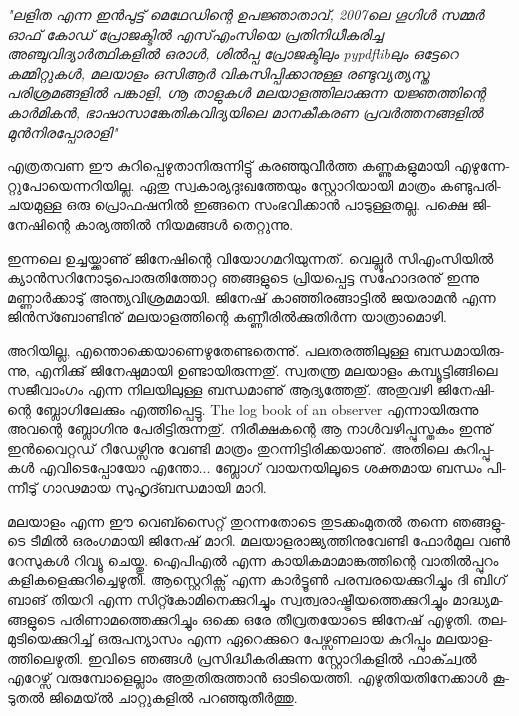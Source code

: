 \vskip 2pt

‌\emph{"ലളിത എന്ന ഇന്‍പുട്ട് മെഥേഡിന്റെ ഉപജ്ഞാതാവ്, 2007ലെ ഗൂഗിള്‍ സമ്മര്‍ ഓഫ് കോഡ് പ്രോജക്ടില്‍ എസ്എംസിയെ 
പ്രതിനിധീകരിച്ച അഞ്ചുവിദ്യാര്‍ത്ഥികളില്‍ ഒരാള്‍, ശില്‍പ്പ പ്രോജക്ടിലും pypdflibലും ഒട്ടേറെ കമ്മിറ്റുകള്‍, മലയാളം ഒസിആര്‍ 
വികസിപ്പിക്കാനുള്ള രണ്ടുവ്യത്യസ്ത പരിശ്രമങ്ങളില്‍ പങ്കാളി, ഗ്നൂ താളുകള്‍ മലയാളത്തിലാക്കുന്ന യജ്ഞത്തിന്റെ കാര്‍മികന്‍, 
ഭാഷാസാങ്കേതികവിദ്യയിലെ മാനകീകരണ പ്രവര്‍ത്തനങ്ങളില്‍ മുന്‍നിരപ്പോരാളി"}

\vskip 2pt

എ­ത്ര­ത­വണ ഈ കു­റി­പ്പെ­ഴു­താ­നി­രു­ന്നി­ട്ടു് കര­ഞ്ഞു­വീര്‍­ത്ത കണ്ണു­ക­ളു­മാ­യി എഴു­ന്നേ­റ്റു­പോ­യെ­ന്ന­റി­യി­ല്ല. ഏതു സ്വ­കാ­ര്യ­ദുഃ­ഖ­ത്തേ­യും 
സ്റ്റോ­റി­യാ­യി മാ­ത്രം കണ്ടു­പ­രി­ച­യ­മു­ള്ള ഒരു പ്രൊ­ഫ­ഷ­നില്‍ ഇങ്ങ­നെ സം­ഭ­വി­ക്കാന്‍ പാ­ടു­ള്ള­ത­ല്ല. പക്ഷെ ജി­നേ­ഷി­ന്റെ 
കാ­ര്യ­ത്തില്‍ നി­യ­മ­ങ്ങള്‍ തെ­റ്റു­ന്നു.

ഇ­ന്ന­ലെ ഉച്ച­യ്ക്കാ­ണു് ജി­നേ­ഷി­ന്റെ വി­യോ­ഗ­മ­റി­യു­ന്ന­ത്. വെ­ല്ലൂര്‍ സി­എം­സി­യില്‍ ക്യാന്‍­സ­റി­നോ­ടു­പൊ­രു­തി­ത്തോ­റ്റ ഞങ്ങ­ളു­ടെ 
പ്രി­യ­പ്പെ­ട്ട സഹോ­ദ­ര­നു് ഇന്നു മണ്ണാര്‍­ക്കാ­ടു് അന്ത്യ­വി­ശ്ര­മ­മാ­യി. ജി­നേ­ഷ് കാ­ഞ്ഞി­ര­ങ്ങാ­ട്ടില്‍ ജയ­രാ­മന്‍ എന്ന ജിന്‍സ്ബോണ്ടിനു്
മല­യാ­ള­ത്തി­ന്റെ കണ്ണീ­രില്‍­ക്കു­തിര്‍­ന്ന യാ­ത്രാ­മൊ­ഴി­.

അ­റി­യി­ല്ല, എന്തൊ­ക്കെ­യാ­ണെ­ഴു­തേ­ണ്ട­തെ­ന്നു്. പല­ത­ര­ത്തി­ലു­ള്ള ബന്ധ­മാ­യി­രു­ന്നു, എനി­ക്കു് ജി­നേ­ഷു­മാ­യി ഉണ്ടാ­യി­രു­ന്ന­തു്. 
സ്വ­ത­ന്ത്ര ­മ­ല­യാ­ളം­ കമ്പ്യൂ­ട്ടി­ങ്ങി­ലെ സജീ­വാം­ഗം എന്ന നി­ല­യി­ലു­ള്ള ബന്ധ­മാ­ണു് ആദ്യ­ത്തേ­തു്. അതു­വ­ഴി ജി­നേ­ഷി­ന്റെ 
ബ്ലോ­ഗി­ലേ­ക്കും എത്തി­പ്പെ­ട്ടു. The log book of an observer എന്നാ­യി­രു­ന്നു അവ­ന്റെ ബ്ലോ­ഗി­നു പേ­രി­ട്ടി­രു­ന്ന­തു്. നി­രീ­ക്ഷ­ക­ന്റെ 
ആ നാള്‍­വ­ഴി­പ്പു­സ്ത­കം ഇന്നു് ഇന്‍­വൈ­റ്റ­ഡ് റീ­ഡേ­ഴ്സി­നു വേ­ണ്ടി മാ­ത്രം തു­റ­ന്നി­ട്ടി­രി­ക്ക­യാ­ണു്. അതി­ലെ കു­റി­പ്പു­കള്‍ 
എവി­ടെ­പ്പോ­യോ എന്തോ­... ബ്ലോ­ഗ് വാ­യ­ന­യി­ലൂ­ടെ ശക്ത­മായ ബന്ധം പി­ന്നീ­ടു് ഗാ­ഢ­മായ സു­ഹൃ­ദ്ബ­ന്ധ­മാ­യി മാ­റി­.

മലയാളം എന്ന ഈ വെ­ബ്സൈ­റ്റ് തു­റ­ന്ന­തോ­ടെ തു­ട­ക്കം­മു­തല്‍ തന്നെ ഞങ്ങ­ളു­ടെ ടീ­മില്‍ ഒരം­ഗ­മാ­യി ജി­നേ­ഷ് മാ­റി. 
മലയാളരാജ്യത്തിനുവേണ്ടി ഫോര്‍­മുല വണ്‍ റേ­സു­കള്‍ റി­വ്യൂ ചെ­യ്തു. ഐപി­എല്‍ എന്ന കാ­യി­ക­മാ­മാ­ങ്ക­ത്തി­ന്റെ വാ­തില്‍­പ്പു­റം 
കളി­ക­ളെ­ക്കു­റി­ച്ചെ­ഴു­തി. ആസ്റ്റെ­റി­ക്സ് എന്ന കാര്‍­ട്ടൂണ്‍ പര­മ്പ­ര­യെ­ക്കു­റി­ച്ചും ദി ബി­ഗ് ബാ­ങ് തി­യ­റി എന്ന സി­റ്റ്കോ­മി­നെ­ക്കു­റി­ച്ചും 
സ്വ­ത്വ­രാ­ഷ്ട്രീ­യ­ത്തെ­ക്കു­റി­ച്ചും മാ­ദ്ധ്യ­മ­ങ്ങ­ളു­ടെ പരി­ണാ­മ­ത്തെ­ക്കു­റി­ച്ചും ഒക്കെ ഒരേ തീ­വ്ര­ത­യോ­ടെ ജി­നേ­ഷ് എഴു­തി. തല­മു­ടി­യെ­ക്കു­റി­ച്ച് 
ഒരു­പ­ന്യാ­സം എന്ന ഏറെ­ക്കു­റെ പേ­ഴ്സ­ണ­ലായ കു­റി­പ്പും മല­യാ­ള­ത്തി­ലെ­ഴു­തി. ഇവി­ടെ ഞങ്ങള്‍ പ്ര­സി­ദ്ധീ­ക­രി­ക്കു­ന്ന സ്റ്റോ­റി­ക­ളില്‍ 
ഫാ­ക്ച്വല്‍ എറേ­ഴ്സ് വരു­മ്പോ­ളെ­ല്ലാം അതു­തി­രു­ത്താന്‍ ഓടി­യെ­ത്തി. എഴു­തി­യ­തി­നേ­ക്കാള്‍ കൂ­ടു­തല്‍ ജി­മെ­യ്ല്‍ ചാ­റ്റു­ക­ളില്‍ 
പറ­ഞ്ഞു­തീര്‍­ത്തു­.

